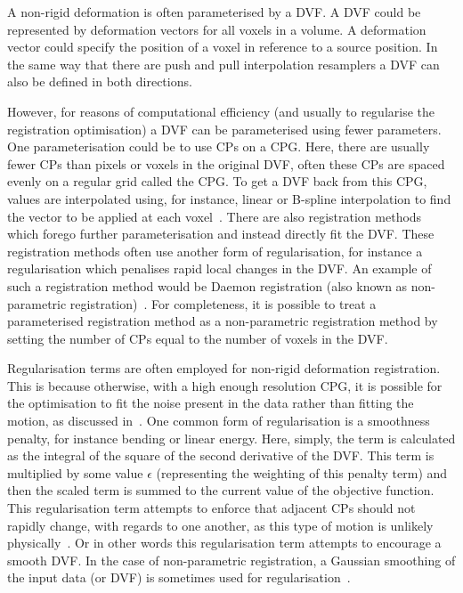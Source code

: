                 A non-rigid deformation is often parameterised by a \gls{DVF}. A \gls{DVF} could be represented by deformation vectors for all voxels in a volume. A deformation vector could specify the position of a voxel in reference to a source position. In the same way that there are push and pull interpolation resamplers a \gls{DVF} can also be defined in both directions.
                
                However, for reasons of computational efficiency (and usually to regularise the registration optimisation) a \gls{DVF} can be parameterised using fewer parameters. One parameterisation could be to use \glspl{CP} on a \gls{CPG}. Here, there are usually fewer \glspl{CP} than pixels or voxels in the original \gls{DVF}, often these \glspl{CP} are spaced evenly on a regular grid called the \gls{CPG}. To get a \gls{DVF} back from this \gls{CPG}, values are interpolated using, for instance, linear or B-spline interpolation to find the vector to be applied at each voxel~\parencite{Bardinet1996, Rueckertetal.1999, Mattes2003, JacobsonFesslerMotionCorrectionBib}. There are also registration methods which forego further parameterisation and instead directly fit the \gls{DVF}. These registration methods often use another form of regularisation, for instance a regularisation which penalises rapid local changes in the \gls{DVF}. An example of such a registration method would be Daemon registration (also known as non-parametric registration)~\parencite{Vercauteren2009DiffeomorphicRegistration.}. For completeness, it is possible to treat a parameterised registration method as a non-parametric registration method by setting the number of \glspl{CP} equal to the number of voxels in the \gls{DVF}.
                
                Regularisation terms are often employed for non-rigid deformation registration. This is because otherwise, with a high enough resolution \gls{CPG}, it is possible for the optimisation to fit the noise present in the data rather than fitting the motion, as discussed in~. One common form of regularisation is a smoothness penalty, for instance bending or linear energy. Here, simply, the term is calculated as the integral of the square of the second derivative of the \gls{DVF}. This term is multiplied by some value $\epsilon$ (representing the weighting of this penalty term) and then the scaled term is summed to the current value of the objective function. This regularisation term attempts to enforce that adjacent \glspl{CP} should not rapidly change, with regards to one another, as this type of motion is unlikely physically~\parencite{Duchon1977SplinesSpaces}. Or in other words this regularisation term attempts to encourage a smooth \gls{DVF}. In the case of non-parametric registration, a Gaussian smoothing of the input data (or \gls{DVF}) is sometimes used for regularisation~\parencite{Vercauteren2009DiffeomorphicRegistration.}.


